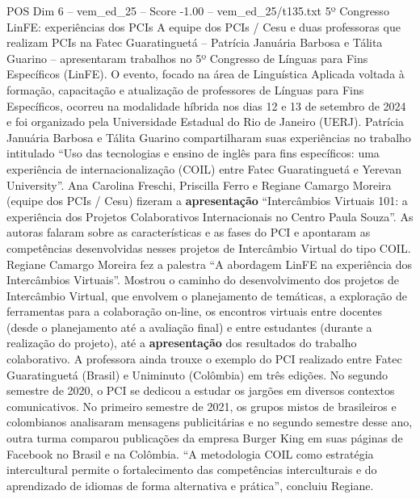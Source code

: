 \begin{textsample}{POS Dim 6 – vem\_ed\_25 – Score -1.00 – vem\_ed\_25/t135.txt}  \label{ex:f6_pos_098}
5º Congresso LinFE: experiências dos PCIs A equipe dos PCIs / Cesu e duas professoras que realizam PCIs na Fatec Guaratinguetá – Patrícia Januária Barbosa e Tálita Guarino – apresentaram trabalhos no 5º Congresso de Línguas para Fins Específicos (LinFE).
O evento, focado na área de Linguística Aplicada voltada à formação, capacitação e atualização de professores de Línguas para Fins Específicos, ocorreu na modalidade híbrida nos dias 12 e 13 de setembro de 2024 e foi organizado pela Universidade Estadual do Rio de Janeiro (UERJ).
Patrícia Januária Barbosa e Tálita Guarino compartilharam suas experiências no trabalho intitulado “Uso das tecnologias e ensino de inglês para fins específicos: uma experiência de internacionalização (COIL) entre Fatec Guaratinguetá e Yerevan University”.
Ana Carolina Freschi, Priscilla Ferro e Regiane Camargo Moreira (equipe dos PCIs / Cesu) fizeram a \textbf{apresentação} “Intercâmbios Virtuais 101: a experiência dos Projetos Colaborativos Internacionais no Centro Paula Souza”.
As autoras falaram sobre as características e as fases do PCI e apontaram as competências desenvolvidas nesses projetos de Intercâmbio Virtual do tipo COIL.
Regiane Camargo Moreira fez a palestra “A abordagem LinFE na experiência dos Intercâmbios Virtuais”.
Mostrou o caminho do desenvolvimento dos projetos de Intercâmbio Virtual, que envolvem o planejamento de temáticas, a exploração de ferramentas para a colaboração on-line, os encontros virtuais entre docentes (desde o planejamento até a avaliação final) e entre estudantes (durante a realização do projeto), até a \textbf{apresentação} dos resultados do trabalho colaborativo.
A professora ainda trouxe o exemplo do PCI realizado entre Fatec Guaratinguetá (Brasil) e Uniminuto (Colômbia) em três edições.
No segundo semestre de 2020, o PCI se dedicou a estudar os jargões em diversos contextos comunicativos.
No primeiro semestre de 2021, os grupos mistos de brasileiros e colombianos analisaram mensagens publicitárias e no segundo semestre desse ano, outra turma comparou publicações da empresa Burger King em suas páginas de Facebook no Brasil e na Colômbia. “A metodologia COIL como estratégia intercultural permite o fortalecimento das competências interculturais e do aprendizado de idiomas de forma alternativa e prática”, concluiu Regiane.

\end{textsample}
